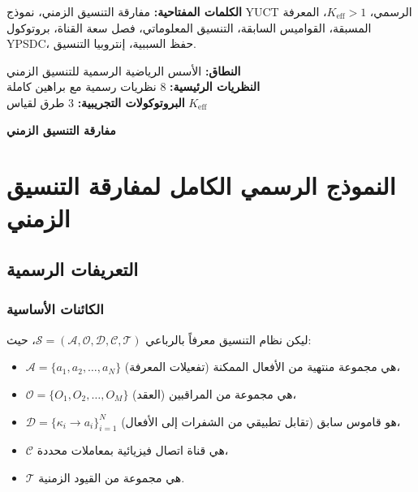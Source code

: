 \documentclass[11pt,a4paper]{article}
\begin{document}
\begin{titlepage}
\begin{center}
			\vspace{0.5cm}
			\normalsize
			\textbf{الكلمات المفتاحية:} مفارقة التنسيق الزمني، نموذج YUCT الرسمي، $K_{\text{eff}} > 1$، المعرفة المسبقة، القواميس السابقة، التنسيق المعلوماتي، فصل سعة القناة، بروتوكول YPSDC، حفظ السببية، إنتروبيا التنسيق.
			
			\vspace{0cm}
			\normalsize
			
			\textbf{النطاق:} الأسس الرياضية الرسمية للتنسيق الزمني \\
			\textbf{النظريات الرئيسية:} 8 نظريات رسمية مع براهين كاملة \\
			\textbf{البروتوكولات التجريبية:} 3 طرق لقياس $K_{\text{eff}}$ \\
			
			\vspace{0.5cm}
			\normalsize
			
		\end{center}
	\end{titlepage}
	
	\begin{center}
		\vspace*{0.5cm}
		\Huge\textbf{مفارقة التنسيق الزمني}
		\vspace{1cm}
	\end{center}
	
	\section{النموذج الرسمي الكامل لمفارقة التنسيق الزمني}
	\label{app:formal-model}
	
	\subsection{التعريفات الرسمية}
	\label{app:definitions}
	
	\subsubsection{الكائنات الأساسية}
	
	ليكن نظام التنسيق معرفاً بالرباعي $\mathcal{S} = (\mathcal{A}, \mathcal{O}, \mathcal{D}, \mathcal{C}, \mathcal{T})$، حيث:
	
	\begin{itemize}
		\item $\mathcal{A} = \{a_1, a_2, \dots, a_N\}$ هي مجموعة منتهية من الأفعال الممكنة (تفعيلات المعرفة)،
		\item $\mathcal{O} = \{O_1, O_2, \dots, O_M\}$ هي مجموعة من المراقبين (العقد)،
		\item $\mathcal{D} = \{\kappa_i \to a_i\}_{i=1}^N$ هو قاموس سابق (تقابل تطبيقي من الشفرات إلى الأفعال)،
		\item $\mathcal{C}$ هي قناة اتصال فيزيائية بمعاملات محددة،
		\item $\mathcal{T}$ هي مجموعة من القيود الزمنية.
	\end{itemize}
	
\end{document}
